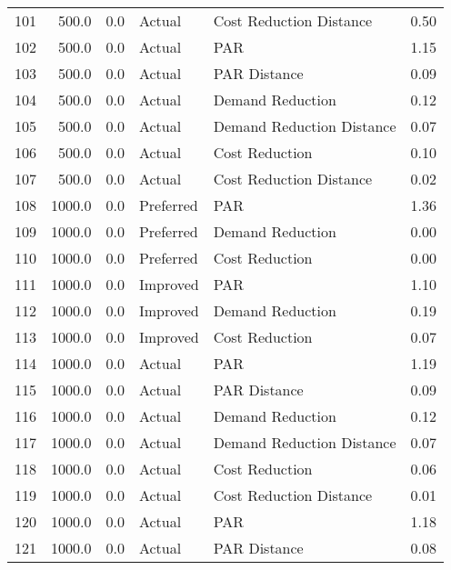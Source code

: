 \begin{longtable}{lrrllr}
101  &        500.0 &     0.0 &         Actual &    Cost Reduction Distance &   0.50 \\
102  &        500.0 &     0.0 &         Actual &                        PAR &   1.15 \\
103  &        500.0 &     0.0 &         Actual &               PAR Distance &   0.09 \\
104  &        500.0 &     0.0 &         Actual &           Demand Reduction &   0.12 \\
105  &        500.0 &     0.0 &         Actual &  Demand Reduction Distance &   0.07 \\
106  &        500.0 &     0.0 &         Actual &             Cost Reduction &   0.10 \\
107  &        500.0 &     0.0 &         Actual &    Cost Reduction Distance &   0.02 \\
108  &       1000.0 &     0.0 &      Preferred &                        PAR &   1.36 \\
109  &       1000.0 &     0.0 &      Preferred &           Demand Reduction &   0.00 \\
110  &       1000.0 &     0.0 &      Preferred &             Cost Reduction &   0.00 \\
111  &       1000.0 &     0.0 &       Improved &                        PAR &   1.10 \\
112  &       1000.0 &     0.0 &       Improved &           Demand Reduction &   0.19 \\
113  &       1000.0 &     0.0 &       Improved &             Cost Reduction &   0.07 \\
114  &       1000.0 &     0.0 &         Actual &                        PAR &   1.19 \\
115  &       1000.0 &     0.0 &         Actual &               PAR Distance &   0.09 \\
116  &       1000.0 &     0.0 &         Actual &           Demand Reduction &   0.12 \\
117  &       1000.0 &     0.0 &         Actual &  Demand Reduction Distance &   0.07 \\
118  &       1000.0 &     0.0 &         Actual &             Cost Reduction &   0.06 \\
119  &       1000.0 &     0.0 &         Actual &    Cost Reduction Distance &   0.01 \\
120  &       1000.0 &     0.0 &         Actual &                        PAR &   1.18 \\
121  &       1000.0 &     0.0 &         Actual &               PAR Distance &   0.08 \\

\end{longtable}
